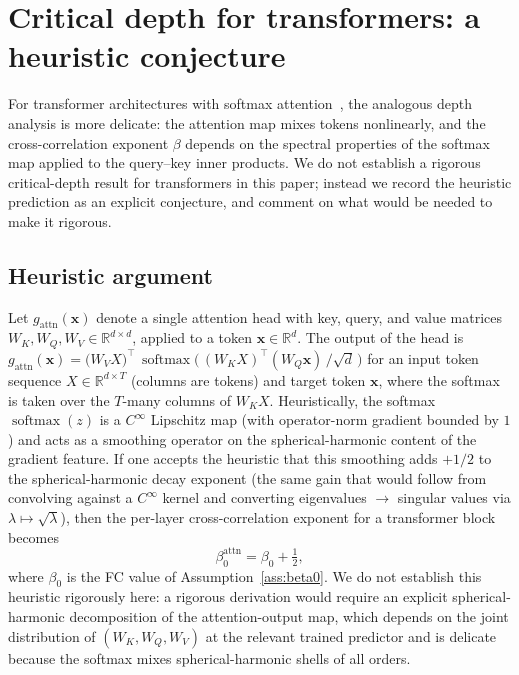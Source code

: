 \documentclass[12pt]{amsart}
\theoremstyle{definition}
\theoremstyle{remark}
\DeclareMathOperator{\softmax}{softmax}
\newcommand{\R}{\mathbb{R}}
\newcommand{\bx}{\mathbf{x}}
\begin{document}
\section{Critical depth for transformers: a heuristic
  conjecture}\label{sec:ld-transformer}

For transformer architectures with softmax attention~\cite{vaswani2017},
the analogous depth analysis is more delicate: the attention map mixes
tokens nonlinearly, and the cross-correlation exponent $\beta$ depends on
the spectral properties of the softmax map applied to the query--key
inner products. We do not establish a rigorous critical-depth result for
transformers in this paper; instead we record the heuristic prediction as
an explicit conjecture, and comment on what would be needed to make it
rigorous.

\subsection{Heuristic argument}

Let $g_{\mathrm{attn}}(\bx)$ denote a single attention head with key,
query, and value matrices $W_{K},W_{Q},W_{V} \in \R^{d\times d}$, applied
to a token $\bx \in \R^{d}$. The output of the head is
$g_{\mathrm{attn}}(\bx) = \bigl(W_{V} X\bigr)^{\top}\,\softmax\!\bigl(\,(W_{K} X)^{\top}(W_{Q}\bx)\,/\sqrt{d}\,\bigr)$
for an input token sequence $X \in \R^{d \times T}$ (columns are
tokens) and target token $\bx$, where the softmax is taken over the
$T$-many columns of $W_{K}X$. Heuristically, the softmax $\softmax(z)$
is a $C^{\infty}$ Lipschitz map (with operator-norm gradient bounded by
$1$) and acts as a smoothing operator on the spherical-harmonic content
of the gradient feature. If one accepts the heuristic that this smoothing
adds $+1/2$ to the spherical-harmonic decay exponent (the same gain that
would follow from convolving against a $C^{\infty}$ kernel and converting
eigenvalues $\to$ singular values via $\lambda \mapsto \sqrt{\lambda}$), then
the per-layer cross-correlation exponent for a transformer block becomes
\[
  \beta_{0}^{\mathrm{attn}} = \beta_{0} + \tfrac{1}{2},
\]
where $\beta_{0}$ is the FC value of Assumption~\ref{ass:beta0}. We do not
establish this heuristic rigorously here: a rigorous derivation would
require an explicit spherical-harmonic decomposition of the
attention-output map, which depends on the joint distribution of
$(W_{K},W_{Q},W_{V})$ at the relevant trained predictor and is delicate
because the softmax mixes spherical-harmonic shells of all orders.
\end{document}
